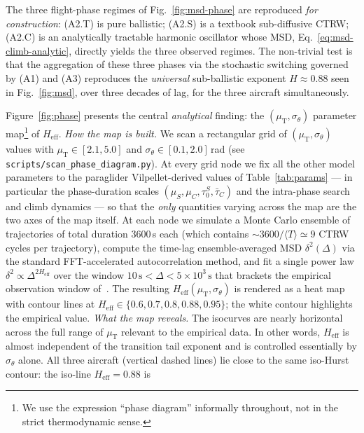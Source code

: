 \documentclass[11pt,a4paper]{article}
\begin{document}
The three flight-phase regimes of Fig.~\ref{fig:msd-phase} are
reproduced \emph{for construction}: (A2.T) is pure ballistic;
(A2.S) is a textbook sub-diffusive CTRW; (A2.C) is an analytically
tractable harmonic oscillator whose MSD,
Eq.~\eqref{eq:msd-climb-analytic}, directly yields the three
observed regimes. The non-trivial test is that the aggregation of
these three phases via the stochastic switching governed by (A1)
and (A3) reproduces the \emph{universal} sub-ballistic exponent
$H \approx 0.88$ seen in Fig.~\ref{fig:msd}, over three decades of
lag, for the three aircraft simultaneously.

Figure~\ref{fig:phase} presents the central \emph{analytical}
finding: the $(\mu_{\mathrm{T}}, \sigma_\theta)$ parameter
map\footnote{We use the expression ``phase diagram'' informally
throughout, not in the strict thermodynamic sense.} of
$H_{\mathrm{eff}}$. \emph{How the map is built.} We scan a rectangular grid of
$(\mu_{\mathrm{T}}, \sigma_\theta)$ values with
$\mu_{\mathrm{T}} \in [2.1, 5.0]$ and
$\sigma_\theta \in [0.1, 2.0]$\,rad (see
\texttt{scripts/scan\_phase\_diagram.py}). At every grid node we
fix all the other model parameters to the paraglider
Vilpellet-derived values of Table~\ref{tab:params} --- in
particular the phase-duration scales
$(\mu_S, \mu_C, \tau_0^S, \bar{\tau}_C)$ and the intra-phase
search and climb dynamics --- so that the \emph{only} quantities
varying across the map are the two axes of the map itself. At each
node we simulate a Monte Carlo ensemble of trajectories of total
duration $3600$\,s each (which contains
$\sim 3600/\langle T\rangle \simeq 9$ CTRW cycles per trajectory),
compute the time-lag ensemble-averaged MSD
$\delta^2(\Delta)$ via the standard FFT-accelerated
autocorrelation method, and fit a single power law
$\delta^2 \propto \Delta^{2H_{\mathrm{eff}}}$ over the window
$10\,\mathrm{s} < \Delta < 5\times 10^3\,\mathrm{s}$ that brackets
the empirical observation window of~\cite{vilpellet2026}. The
resulting $H_{\mathrm{eff}}(\mu_{\mathrm{T}}, \sigma_\theta)$ is
rendered as a heat map with contour lines at
$H_{\mathrm{eff}} \in \{0.6, 0.7, 0.8, 0.88, 0.95\}$; the white
contour highlights the empirical value. \emph{What the map reveals.}
The isocurves are nearly horizontal across the full range of
$\mu_{\mathrm{T}}$ relevant to the empirical data. In other words,
$H_{\mathrm{eff}}$ is almost independent of the transition tail
exponent and is controlled essentially by $\sigma_\theta$ alone.
All three aircraft (vertical dashed lines) lie close to the same
iso-Hurst contour: the iso-line $H_{\mathrm{eff}}=0.88$ is
\end{document}
